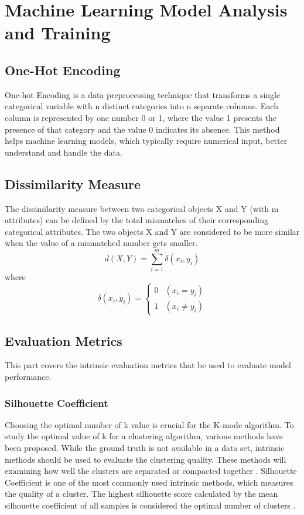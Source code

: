 \documentclass[12pt]{article}
\begin{document}
\section{Machine Learning Model Analysis and Training}
\subsection{One-Hot Encoding}
One-hot Encoding is a data preprocessing technique that transforms a single categorical variable with n distinct categories 
into n separate columns. Each column is represented by one number 0 or 1, where the value 1 presents the presence of that category 
and the value 0 indicates its absence.\citep{thuy2020optimize} This method helps machine learning models, which typically require numerical input, 
better understand and handle the data.

\subsection{Dissimilarity Measure}
The dissimilarity measure between two categorical objects X and Y (with m attributes) can be defined by the total mismatches of their corresponding categorical attributes. The two objects X and Y are considered to be more similar when the value of a mismatched number gets smaller.\citep{huang1998extensions}
        $$d(X,Y) = \sum_{i=1}^{m}\delta{(x_i,y_i)}$$ where $$\delta{(x_i,y_i)} = \left\{\begin{array}{ll} 0 & (x_i = y_i) \\
        1 & (x_i \neq y_i)\end{array}\right.$$

\subsection{Evaluation Metrics} \label{evaluation metrics}
This part covers the intrinsic evaluation metrics that be used to evaluate model performance.

\subsubsection{Silhouette Coefficient}

\noindent Choosing the optimal number of k value is crucial for the 
K-mode algorithm. To study the optimal value of k for a clustering algorithm, 
various methods have been proposed. While the ground truth is not available
in a data set, intrinsic methods should be used to evaluate the 
clustering quality. These methods will examining how well the clusters
are separated or compacted together \citep{2012vi}. Silhouette Coefficient is one of the most
commonly used intrinsic methods, which measures the quality of a cluster. The highest
silhouette score calculated by the mean silhouette coefficient of all samples
is considered the optimal number of clusters \citep{9260048}. \\
\end{document}
